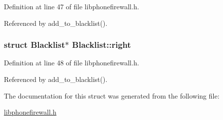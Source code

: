 Definition at line 47 of file libphonefirewall.h.

Referenced by add\_\-to\_\-blacklist().\hypertarget{structBlacklist_86826704e9c8385b086560b4ec190a8f}{
\subsubsection{\setlength{\rightskip}{0pt plus 5cm}struct {\bf Blacklist}$\ast$ {\bf Blacklist::right}}}
\label{structBlacklist_86826704e9c8385b086560b4ec190a8f}




Definition at line 48 of file libphonefirewall.h.

Referenced by add\_\-to\_\-blacklist().

The documentation for this struct was generated from the following file:\begin{CompactItemize}
\item 
\hyperlink{libphonefirewall_8h}{libphonefirewall.h}\end{CompactItemize}
